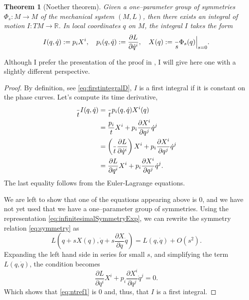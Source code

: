 \documentclass[english,fontsize=11pt,paper=a5,oneside]{scrbook}
\newcommand{\R}{\mathbb{R}}
\let\d\relax
\DeclareMathOperator{\d}{d}
\newtheorem{theorem}{Theorem}[chapter]
\theoremstyle{definition}
\begin{document}
\begin{theorem}[Noether theorem]\label{thm:noether}
    Given a one--parameter group of symmetries $\Phi_s: M \to M$ of the mechanical system $(M,L)$, then there exists an integral of motion $I: TM \to \R$.
    In local coordinates $q$ on $M$, the integral $I$ takes the form
    \begin{equation}
        I(q,\dot q) := p_i X^i,
        \quad p_i(q, \dot q) := \frac{\partial L}{\partial \dot q^i},
        \quad X(q) := \frac{\d}{\d s} \Phi_s(q) \Big|_{s=0}.
    \end{equation}
\end{theorem}

Although I prefer the presentation of the proof in \cite[Chapter 20.B]{book:arnold}, I will give here one with a slightly different perspective.
\begin{proof}
    By definition, see \eqref{eq:firstintegralD}, $I$ is a first integral if it is constant on the phase curves.
    Let's compute its time derivative,
    \begin{align}
        \frac{\d}{\d t} I(q, \dot q)
          & = \frac{\d}{\d t} p_i(q, \dot q) X^i(q) \\
          &= \frac{\d p_i}{\d t} X^i + p_i \frac{\partial X^i}{\partial q^j} \dot q^j \\
          &= \left(\frac{\d}{\d t}\frac{\partial L}{\partial \dot q^i}\right) X^i + p_i \frac{\partial X^i}{\partial q^j} \dot q^j \\
          &= \frac{\partial L}{\partial q^i} X^i + p_i \frac{\partial X^i}{\partial q^j} \dot q^j. \label{eq:ntref1}
    \end{align}
    The last equality follows from the Euler-Lagrange equations.
    
    We are left to show that one of the equations appearing above is $0$, and we have not yet used that we have a one--parameter group of symmetries.
    Using the representation \eqref{eq:infinitesimalSymmetryExp}, we can rewrite the symmetry relation \eqref{eq:symmetry} as
    \begin{equation}\label{eq:invariance}
        L\left( q + s X(q), \dot q + s \frac{\partial X}{\partial q} \dot q\right) = L(q, \dot q) + O(s^2).
    \end{equation}
    Expanding the left hand side in series for small $s$, and simplifying the term $L(q, \dot q)$, the condition becomes
    \begin{equation}\label{eq:ntref2}
        \frac{\partial L}{\partial q^i} X^i + p_i \frac{\partial X^i}{\partial q^j} \dot q^j = 0.
    \end{equation}
    Which shows that \eqref{eq:ntref1} is $0$ and, thus, that $I$ is a first integral.
\end{proof}
\end{document}
